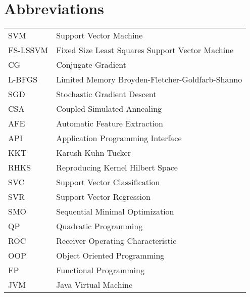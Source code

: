 \documentclass[master=mai,masteroption=ecs]{kulemt}
\begin{document}
\section*{Abbreviations}
\begin{flushleft}
  \renewcommand{\arraystretch}{1.1}
  \begin{tabularx}{\textwidth}{@{}p{12mm}X@{}}
    SVM   & Support Vector Machine \\
    FS-LSSVM   & Fixed Size Least Squares Support Vector Machine \\
    CG   & Conjugate Gradient \\
    L-BFGS & Limited Memory Broyden-Fletcher-Goldfarb-Shanno\\
    SGD & Stochastic Gradient Descent\\
    CSA  & Coupled Simulated Annealing \\
    AFE  & Automatic Feature Extraction \\
    API  & Application Programming Interface \\ 
    KKT  & Karush Kuhn Tucker \\
    RHKS & Reproducing Kernel Hilbert Space\\
    SVC & Support Vector Classification\\
    SVR & Support Vector Regression\\
    SMO & Sequential Minimal Optimization\\
    QP & Quadratic Programming\\
    ROC & Receiver Operating Characteristic\\
    OOP & Object Oriented Programming\\
    FP & Functional Programming\\
    JVM & Java Virtual Machine\\
  \end{tabularx}
\end{flushleft}
\end{document}
